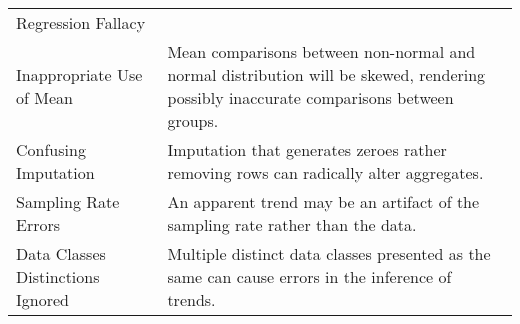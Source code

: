 \begin{longtable}{p{5cm}p{12cm}}
 \rowcolor{colorb-opaque}Regression Fallacy &  \cite{few2019loom}\\
 \rowcolor{colorb}Inappropriate Use of Mean & Mean comparisons between non-normal and normal distribution will be skewed, rendering possibly inaccurate comparisons between groups. \cite{few2019loom}\\
 \rowcolor{colorb-opaque}Confusing Imputation & Imputation that generates zeroes rather removing rows can radically alter aggregates. \cite{song2018s}\\
 \rowcolor{colorb}Sampling Rate Errors  & An apparent trend may be an artifact of the sampling rate rather than the data. \cite{kindlmann2014algebraic}\\
 \rowcolor{colorb-opaque}Data Classes Distinctions Ignored & Multiple distinct data classes presented as the same can cause errors in the inference of trends. \cite{anand2015automatic}\\


\end{longtable}
